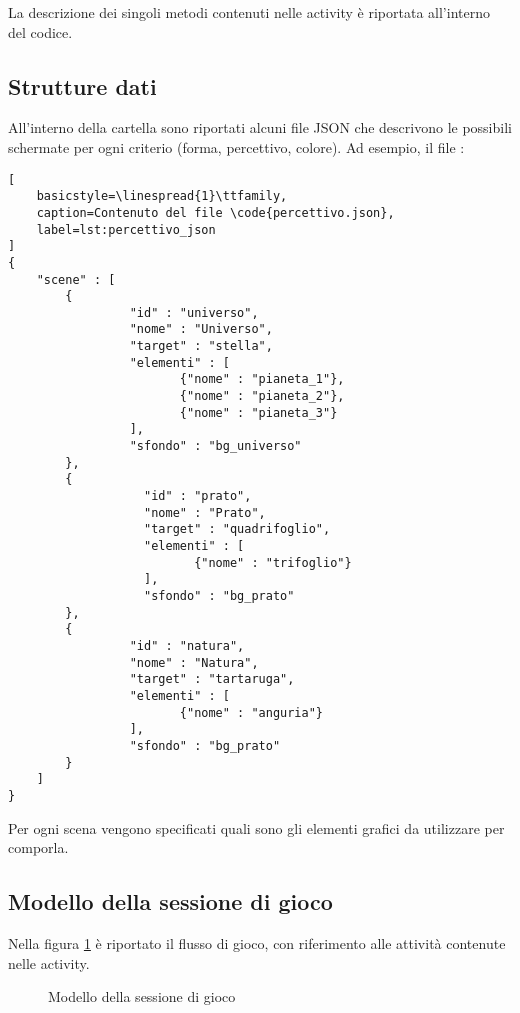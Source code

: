 La descrizione dei singoli metodi contenuti nelle activity è riportata all'interno del codice.

\subsection{Strutture dati}
All'interno della cartella  sono riportati alcuni file JSON che descrivono le possibili schermate per ogni criterio (forma, percettivo, colore). Ad esempio, il file :

\begin{lstlisting}[
    basicstyle=\linespread{1}\ttfamily,
    caption=Contenuto del file \code{percettivo.json},
    label=lst:percettivo_json
]
{
    "scene" : [
        {
                 "id" : "universo",
                 "nome" : "Universo",
                 "target" : "stella",
                 "elementi" : [
                        {"nome" : "pianeta_1"},
                        {"nome" : "pianeta_2"},
                        {"nome" : "pianeta_3"}
                 ],
                 "sfondo" : "bg_universo"
        },
        {
                   "id" : "prato",
                   "nome" : "Prato",
                   "target" : "quadrifoglio",
                   "elementi" : [
                          {"nome" : "trifoglio"}
                   ],
                   "sfondo" : "bg_prato"
        },
        {
                 "id" : "natura",
                 "nome" : "Natura",
                 "target" : "tartaruga",
                 "elementi" : [
                        {"nome" : "anguria"}
                 ],
                 "sfondo" : "bg_prato"
        }
    ]
}
\end{lstlisting}

Per ogni scena vengono specificati quali sono gli elementi grafici da utilizzare per comporla.

\subsection{Modello della sessione di gioco}
Nella figura \ref{fig:session} è riportato il flusso di gioco, con riferimento alle attività contenute nelle activity.

\begin{figure}[h!]
\caption{Modello della sessione di gioco}
\label{fig:session}
\end{figure}
